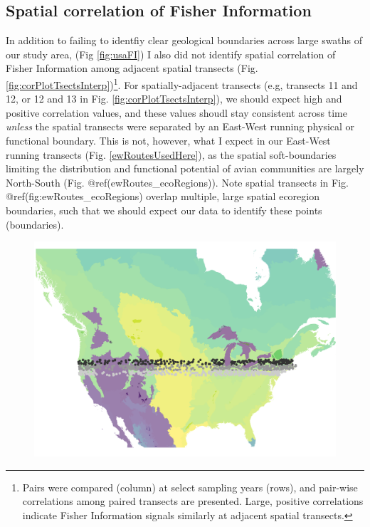 \documentclass[12pt,twoside,openany]{reedthesis}
\begin{document}
\hypertarget{spatial-correlation-of-fisher-information-1}{%
\subsection{Spatial correlation of Fisher Information}\label{spatial-correlation-of-fisher-information-1}}

In addition to failing to identfiy clear geological boundaries across large swaths of our study area, (Fig \ref{fig:usaFI}) I also did not identify spatial correlation of Fisher Information among adjacent spatial transects (Fig. \ref{fig:corPlotTsectsInterp})\footnote{Pairs were compared (column) at select sampling years (rows), and pair-wise correlations among paired transects are presented. Large, positive correlations indicate Fisher Information signals similarly at adjacent spatial transects.}. For spatially-adjacent transects (e.g, transects 11 and 12, or 12 and 13 in Fig. \ref{fig:corPlotTsectsInterp}), we should expect high and positive correlation values, and these values shoudl stay consistent across time \emph{unless} the spatial transects were separated by an East-West running physical or functional boundary. This is not, however, what I expect in our East-West running transects (Fig. \ref{ewRoutesUsedHere}), as the spatial soft-boundaries limiting the distribution and functional potential of avian communities are largely North-South (Fig. @ref(ewRoutes\_ecoRegions)). Note spatial transects in Fig. @ref(fig:ewRoutes\_ecoRegions) overlap multiple, large spatial ecoregion boundaries, such that we should expect our data to identify these points (boundaries).
\begin{figure}
\includegraphics[width=0.85\linewidth]{./chapterFiles/fisherSpatial/figures/figsCalledInDiss/allRoutesUsed_ecoregions} \end{figure}
\end{document}
